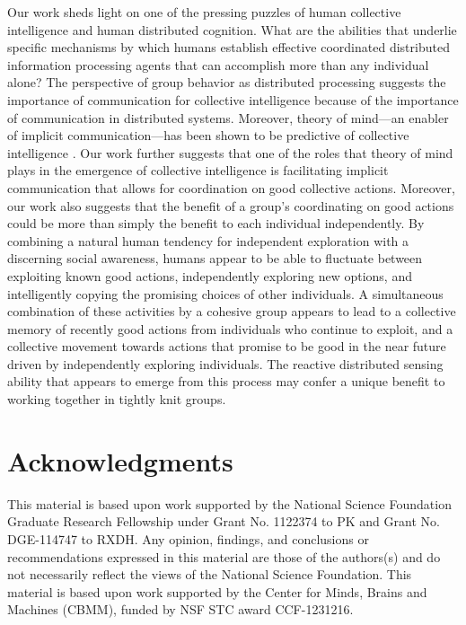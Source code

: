 \documentclass[12pt,letterpaper]{article}
\begin{document}
Our work sheds light on one of the pressing puzzles of
human collective intelligence and human distributed cognition.  What
are the abilities that underlie specific mechanisms by which humans establish effective
coordinated distributed information processing agents that can
accomplish more than any individual alone?  The perspective of group behavior as
distributed processing \cite{hutchins_cognition_1995} suggests the
importance of communication for collective intelligence because of the
importance of communication in distributed systems.  Moreover, theory
of mind---an enabler of implicit communication---has been shown to be
predictive of collective intelligence \cite{woolley_evidence_2010,
  engel_reading_2014}.  Our work further
suggests that one of the roles that theory of mind plays in the
emergence of collective intelligence is facilitating implicit
communication that allows for coordination on good collective actions.
Moreover, our work also suggests that the benefit of a group's
coordinating on good actions could be more than simply the benefit to
each individual independently.  By combining a natural human tendency
for independent exploration with a discerning social awareness, humans
appear to be able to fluctuate between exploiting known good actions,
independently exploring new options, and intelligently copying the
promising choices of other individuals.  A simultaneous combination of
these activities by a cohesive group appears to lead to a collective
memory of recently good actions from individuals who continue to
exploit, and a collective movement towards actions that promise to be
good in the near future driven by independently exploring individuals.
The reactive distributed sensing ability that appears to emerge from
this process may confer a unique benefit to working together in
tightly knit groups.

\section{Acknowledgments}

\small

This material is based upon work supported by the National Science
Foundation Graduate Research Fellowship under Grant No. 1122374 to PK
and Grant No. DGE-114747 to RXDH. Any opinion, findings, and
conclusions or recommendations expressed in this material are those of
the authors(s) and do not necessarily reflect the views of the
National Science Foundation.  This material is based upon work
supported by the Center for Minds, Brains and Machines (CBMM), funded
by NSF STC award CCF-1231216.
\end{document}
